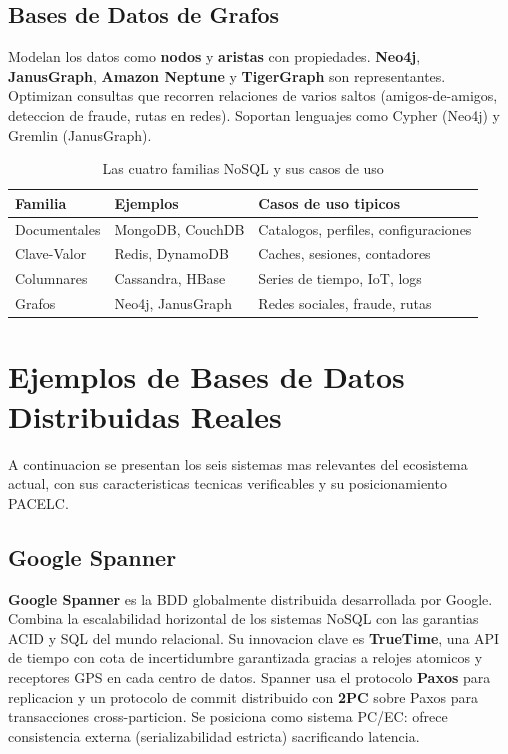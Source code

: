 \documentclass[11pt,a4paper]{article}
\begin{document}
\subsection{Bases de Datos de Grafos}

Modelan los datos como \textbf{nodos} y \textbf{aristas} con propiedades. \textbf{Neo4j}, \textbf{JanusGraph}, \textbf{Amazon Neptune} y \textbf{TigerGraph} son representantes. Optimizan consultas que recorren relaciones de varios saltos (amigos-de-amigos, deteccion de fraude, rutas en redes). Soportan lenguajes como Cypher (Neo4j) y Gremlin (JanusGraph).

\begin{table}[H]
\centering
\caption{Las cuatro familias NoSQL y sus casos de uso}
\small
\begin{tabular}{lll}
\toprule
\textbf{Familia} & \textbf{Ejemplos} & \textbf{Casos de uso tipicos} \\
\midrule
Documentales & MongoDB, CouchDB & Catalogos, perfiles, configuraciones \\
Clave-Valor & Redis, DynamoDB & Caches, sesiones, contadores \\
Columnares & Cassandra, HBase & Series de tiempo, IoT, logs \\
Grafos & Neo4j, JanusGraph & Redes sociales, fraude, rutas \\
\bottomrule
\end{tabular}
\label{tab:nosql}
\end{table}

\section{Ejemplos de Bases de Datos Distribuidas Reales}

A continuacion se presentan los seis sistemas mas relevantes del ecosistema actual, con sus caracteristicas tecnicas verificables y su posicionamiento PACELC.

\subsection{Google Spanner}

\textbf{Google Spanner} es la BDD globalmente distribuida desarrollada por Google. Combina la escalabilidad horizontal de los sistemas NoSQL con las garantias ACID y SQL del mundo relacional. Su innovacion clave es \textbf{TrueTime}, una API de tiempo con cota de incertidumbre garantizada gracias a relojes atomicos y receptores GPS en cada centro de datos. Spanner usa el protocolo \textbf{Paxos} para replicacion y un protocolo de commit distribuido con \textbf{2PC} sobre Paxos para transacciones cross-particion. Se posiciona como sistema PC/EC: ofrece consistencia externa (serializabilidad estricta) sacrificando latencia.
\end{document}
